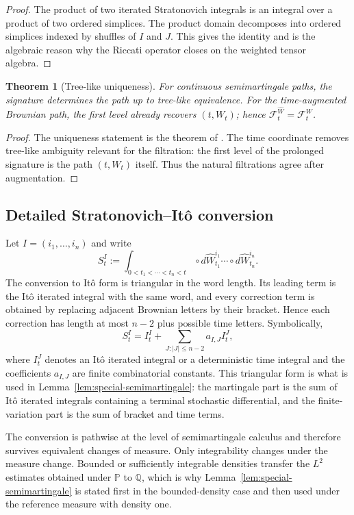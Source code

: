 \documentclass[11pt,oneside]{article}
\theoremstyle{plain}
\newtheorem{theorem}{Theorem}[section]
\theoremstyle{definition}
\theoremstyle{remark}
\newcommand{\Q}{\mathbb{Q}}
\newcommand{\Pp}{\mathbb{P}}
\newcommand{\cW}{\widehat W}
\newcommand{\FWh}{\mathcal F^{\widehat W}}
\newcommand{\FW}{\mathcal F^W}
\begin{document}
\begin{proof}
The product of two iterated Stratonovich integrals is an integral over a product of two ordered simplices. The product domain decomposes into ordered simplices indexed by shuffles of $I$ and $J$. This gives the identity and is the algebraic reason why the Riccati operator closes on the weighted tensor algebra.
\end{proof}

\begin{theorem}[Tree-like uniqueness]
For continuous semimartingale paths, the signature determines the path up to tree-like equivalence. For the time-augmented Brownian path, the first level already recovers $(t,W_t)$; hence $\FWh_t=\FW_t$.
\end{theorem}

\begin{proof}
The uniqueness statement is the theorem of \citet{BoedihardjoGengLyonsYang2016}. The time coordinate removes tree-like ambiguity relevant for the filtration: the first level of the prolonged signature is the path $(t,W_t)$ itself. Thus the natural filtrations agree after augmentation.
\end{proof}



\subsection*{Detailed Stratonovich--It\^o conversion}
Let $I=(i_1,\ldots,i_n)$ and write
\[
S^I_t:=\int_{0<t_1<\cdots<t_n<t}\circ d\cW^{i_1}_{t_1}\cdots \circ d\cW^{i_n}_{t_n}.
\]
The conversion to It\^o form is triangular in the word length. Its leading term is the It\^o iterated integral with the same word, and every correction term is obtained by replacing adjacent Brownian letters by their bracket. Hence each correction has length at most $n-2$ plus possible time letters. Symbolically,
\[
S^I_t=I^I_t+\sum_{J:|J|\leq n-2} a_{I,J} I^J_t,
\]
where $I^J_t$ denotes an It\^o iterated integral or a deterministic time integral and the coefficients $a_{I,J}$ are finite combinatorial constants. This triangular form is what is used in Lemma~\ref{lem:special-semimartingale}: the martingale part is the sum of It\^o iterated integrals containing a terminal stochastic differential, and the finite-variation part is the sum of bracket and time terms.

The conversion is pathwise at the level of semimartingale calculus and therefore survives equivalent changes of measure. Only integrability changes under the measure change. Bounded or sufficiently integrable densities transfer the $L^2$ estimates obtained under $\Pp$ to $\Q$, which is why Lemma~\ref{lem:special-semimartingale} is stated first in the bounded-density case and then used under the reference measure with density one.
\end{document}
